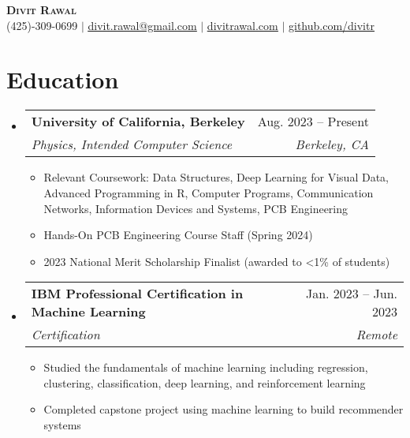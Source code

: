 \documentclass[letterpaper,11pt]{article}
\makeatletter
\newcommand{\resumeItem}[1]{
  \item\small{
    {#1 \vspace{-2pt}}
  }
}
\newcommand{\resumeSubheading}[4]{
  \vspace{-2pt}\item
    \begin{tabular*}{0.97\textwidth}[t]{l@{\extracolsep{\fill}}r}
      \textbf{#1} & #2 \\
      \textit{\small#3} & \textit{\small #4} \\
    \end{tabular*}\vspace{-7pt}
}
\newcommand{\resumeSubHeadingListStart}{\begin{itemize}[leftmargin=0.15in, label={}]}
\newcommand{\resumeSubHeadingListEnd}{\end{itemize}}
\newcommand{\resumeItemListStart}{\begin{itemize}}
\newcommand{\resumeItemListEnd}{\end{itemize}\vspace{-5pt}}
\makeatother
\begin{document}

\begin{center}
    \textbf{\Huge \scshape Divit Rawal} \\ \vspace{1pt}
    \small (425)-309-0699 $|$ \href{mailto:divit.rawal@gmail.com}{\underline{divit.rawal@gmail.com}} $|$ 
    \href{https://www.divitrawal.com}{\underline{divitrawal.com}} $|$
    \href{https://www.github.com/divitr/}{\underline{github.com/divitr}}
\end{center}

\section{Education}
  \resumeSubHeadingListStart
    \resumeSubheading
      {University of California, Berkeley}{Aug. 2023 -- Present}
      {Physics, Intended Computer Science}{Berkeley, CA}
      \resumeItemListStart
        \resumeItem{Relevant Coursework: Data Structures, Deep Learning for Visual Data, Advanced Programming in R, Computer Programs, Communication Networks,  Information Devices and Systems, PCB Engineering}
        \resumeItem{Hands-On PCB Engineering Course Staff (Spring 2024)}
        \resumeItem{2023 National Merit Scholarship Finalist (awarded to \textless 1\% of students)}
      \resumeItemListEnd
  \resumeSubHeadingListEnd

  \resumeSubHeadingListStart
    \resumeSubheading
      {IBM Professional Certification in Machine Learning}{Jan. 2023 -- Jun. 2023}
      {Certification}{Remote}
      \resumeItemListStart
        \resumeItem{Studied the fundamentals of machine learning including regression, clustering, classification, deep learning, and reinforcement learning}
        \resumeItem{Completed capstone project using machine learning to build recommender systems}
      \resumeItemListEnd
  \resumeSubHeadingListEnd
\end{document}
